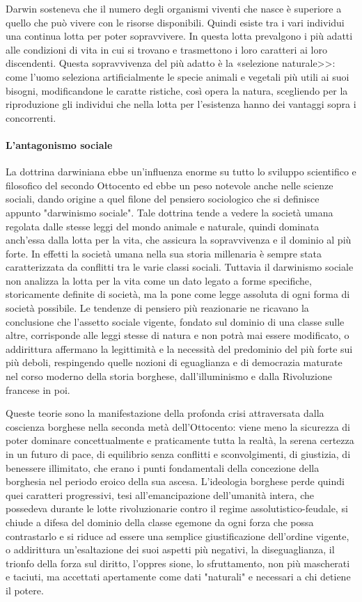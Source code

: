 \documentclass{book}
\begin{document}
Darwin sosteneva che il numero degli organismi viventi che nasce è superiore a quello che può vivere con le risorse disponibili. Quindi esiste tra i vari individui una continua lotta per poter sopravvivere. In questa lotta prevalgono i più adatti alle condizioni di vita in cui si trovano e trasmettono i loro caratteri ai loro discendenti. Questa sopravvivenza del più adatto è la «selezione naturale>>: come l'uomo seleziona artificialmente le specie animali e vegetali più utili ai suoi bisogni, modificandone le caratte ristiche, così opera la natura, scegliendo per la riproduzione gli individui che nella lotta per l'esistenza hanno dei vantaggi sopra i concorrenti.

\paragraph{L'antagonismo sociale} La dottrina darwiniana ebbe un'influenza enorme su tutto lo sviluppo scientifico e filosofico del secondo Ottocento ed ebbe un peso notevole anche nelle scienze sociali, dando origine a quel filone del pensiero sociologico che si definisce appunto "darwinismo sociale". Tale dottrina tende a vedere la società umana regolata dalle stesse leggi del mondo animale e naturale, quindi dominata anch'essa dalla lotta per la vita, che assicura la sopravvivenza e il dominio al più forte. In effetti la società umana nella sua storia millenaria è sempre stata caratterizzata da conflitti tra le varie classi sociali. Tuttavia il darwinismo sociale non analizza la lotta per la vita come un dato legato a forme specifiche, storicamente definite di società, ma la pone come legge assoluta di ogni forma di società possibile. Le tendenze di pensiero più reazionarie ne ricavano la conclusione che l'assetto sociale vigente, fondato sul dominio di una classe sulle altre, corrisponde alle leggi stesse di natura e non potrà mai essere modificato, o addirittura affermano la legittimità e la necessità del predominio del più forte sui più deboli, respingendo quelle nozioni di eguaglianza e di democrazia maturate nel corso moderno della storia borghese, dall'illuminismo e dalla Rivoluzione francese in poi.

Queste teorie sono la manifestazione della profonda crisi attraversata dalla coscienza borghese nella seconda metà dell'Ottocento: viene meno la sicurezza di poter dominare concettualmente e praticamente tutta la realtà, la serena certezza in un futuro di pace, di equilibrio senza conflitti e sconvolgimenti, di giustizia, di benessere illimitato, che erano i punti fondamentali della concezione della borghesia nel periodo eroico della sua ascesa. L'ideologia borghese perde quindi quei caratteri progressivi, tesi all'emancipazione dell'umanità intera, che possedeva durante le lotte rivoluzionarie contro il regime assolutistico-feudale, si chiude a difesa del dominio della classe egemone da ogni forza che possa contrastarlo e si riduce ad essere una semplice giustificazione dell'ordine vigente, o addirittura un'esaltazione dei suoi aspetti più negativi, la diseguaglianza, il trionfo della forza sul diritto, l'oppres sione, lo sfruttamento, non più mascherati e taciuti, ma accettati apertamente come dati "naturali" e necessari a chi detiene il potere.
\end{document}
